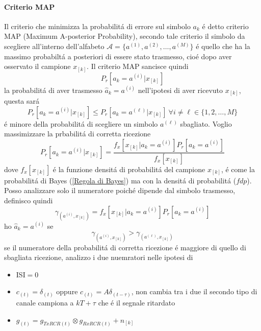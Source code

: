         \paragraph{Criterio MAP}
            Il criterio che minimizza la probabilitá di errore sul simbolo $a_k$ é detto criterio MAP (Maximum A-posterior Probability),
            secondo tale criterio il simbolo da scegliere all'interno dell'alfabeto $\mathcal{A} = \{a^{(1)},a^{(2)},\dots,a^{(M)}\}$
            é quello che ha la massimo probabiltá a posteriori di essere stato trasmesso, cioé dopo aver osservato il campione $x_{[k]}$.
            Il criterio MAP sancisce quindi 
            \[
                P_r[a_k = a^{(i)}|x_{[k]}]    
            \]
            la probabilitá di aver trasmesso $\hat{a}_{k}=a^{(i)}$ nell'ipotesi di aver ricevuto $x_{[k]}$, questa sará
            \[
                P_r[a_k = a^{(i)}|x_{[k]}] \leq P_r[a_k = a^{(\ell)}|x_{[k]}]\ \forall i\neq \ell\in \{1,2,\dots,M\}    
            \]
            é minore della probabilitá di scegliere un simbolo $a^{(\ell)}$ sbagliato. Voglio massimizzare la prbabilitá di 
            corretta ricezione 
            \[
                P_r[a_k = a^{(i)}|x_{[k]}] = \frac{f_x[x_{[k]}|a_k = a^{(i)}]P_r[a_k = a^{(i)}]}{f_x[x_{[k]}]}    
            \]
            dove $f_x[x_{[k]}]$ é la funzione densitá di probabilitá del campione $x_{[k]}$,
            é come la probabilitá di Bayes (\ref{Regola di Bayes}) ma con la densitá di probabilitá ($fdp$). Posso analizzare
            solo il numeratore poiché dipende dal simbolo trasmesso, definisco quindi 
            \[
                \gamma_{(a^{(i)},x_{[k]})} = f_x[x_{[k]}|a_k = a^{(i)}]P_r[a_k = a^{(i)}]
            \] 
            ho $\hat{a}_k = a^{(i)}$ se 
            \[
                \gamma_{(a^{(i)},x_{[k]})} > \gamma_{(a^{(\ell)},x_{[k]})}
            \]
            se il numeratore della probabilitá di corretta ricezione é maggiore di quello di sbagliata ricezione, 
            analizzo i due nuemratori nelle ipotesi di 
            \begin{itemize}
                \item {ISI$=0$}
                \item {$c_{(t)} = \delta_{(t)}$ oppure $c_{(t)} = A\delta_{(t-\tau)}$, non cambia tra i due il secondo tipo di canale campiona a $kT+\tau$
                    che é il segnale ritardato}
                \item {$g_{(t)} = g_{TxRCR(t)}\otimes g_{RxRCR(t)} + n_{[k]}$}
            \end{itemize}
